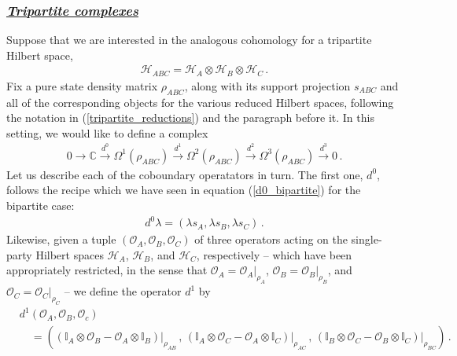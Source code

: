 \documentclass[12pt]{article}
\newcommand{\ul}[1]{{\underline{#1}}}
\numberwithin{equation}{section}
\begin{document}
\subsubsection*{\ul{\it Tripartite complexes}}

Suppose that we are interested in the analogous cohomology for a tripartite Hilbert space,
%
\begin{align}
    \mathcal{H}_{ABC} = \mathcal{H}_A \otimes \mathcal{H}_B \otimes \mathcal{H}_C \, .
\end{align}
%
Fix a pure state density matrix $\rho_{ABC}$, along with its support projection $s_{ABC}$ and all of the corresponding objects for the various reduced Hilbert spaces, following the notation in (\ref{tripartite_reductions}) and the paragraph before it. In this setting, we would like to define a complex
%
\begin{align}\label{tripartite_complex_defn}
    0 \xrightarrow{\; \;} \mathbb{C} \xrightarrow{d^0} \Omega^1 \left( \rho_{ABC} \right) \xrightarrow{d^1} \Omega^2 \left( \rho_{ABC} \right) \xrightarrow{d^2} \Omega^3 \left( \rho_{ABC} \right) \xrightarrow{d^3} 0 \, .
\end{align}
%
Let us describe each of the coboundary operatators in turn. The first one, $d^0$, follows the recipe which we have seen in equation (\ref{d0_bipartite}) for the bipartite case:
%
\begin{align}
    d^0 \lambda = ( \lambda s_A , \lambda s_B , \lambda s_C ) \, .
\end{align}
%
Likewise, given a tuple $( \mathcal{O}_A , \mathcal{O}_B , \mathcal{O}_C )$ of three operators acting on the single-party Hilbert spaces $\mathcal{H}_A$, $\mathcal{H}_B$, and $\mathcal{H}_C$, respectively -- which have been appropriately restricted, in the sense that $\mathcal{O}_A = \mathcal{O}_A \big\vert_{\rho_A}$, $\mathcal{O}_B = \mathcal{O}_B \big\vert_{\rho_B}$, and $\mathcal{O}_C = \mathcal{O}_C \big\vert_{\rho_C}$ -- we define the operator $d^1$ by
%
\begin{align}\label{tripartite_d1}
    &d^1 ( \mathcal{O}_A , \mathcal{O}_B, \mathcal{O}_c ) \nonumber \\
    &\quad = \left( \left( \mathbb{I}_A \otimes \mathcal{O}_B - \mathcal{O}_A \otimes \mathbb{I}_B \right) \big\vert_{\rho_{AB}} \, , \, \left( \mathbb{I}_A \otimes \mathcal{O}_C - \mathcal{O}_A \otimes \mathbb{I}_C \right) \big\vert_{\rho_{AC}} \, , \, \left( \mathbb{I}_B \otimes \mathcal{O}_C - \mathcal{O}_B \otimes \mathbb{I}_C \right) \big\vert_{\rho_{BC}} \right) \, .
\end{align}
\end{document}
